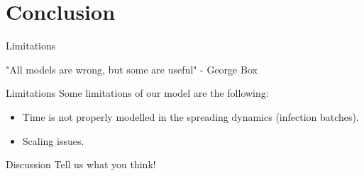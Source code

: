 \documentclass{beamer}
\begin{document}
\section{Conclusion}

\begin{frame}{Limitations}
\begin{center}
    "All models are wrong, but some are useful" 
    - George Box
\end{center}
\end{frame}

\begin{frame}{Limitations}
Some limitations of our model are the following:
\begin{itemize}
\item<1-> Time is not properly modelled in the spreading dynamics (infection batches).
\item<2-> Scaling issues.
\end{itemize}
\end{frame}

\begin{frame}{Discussion}
Tell us what you think!
\end{frame}
\end{document}
